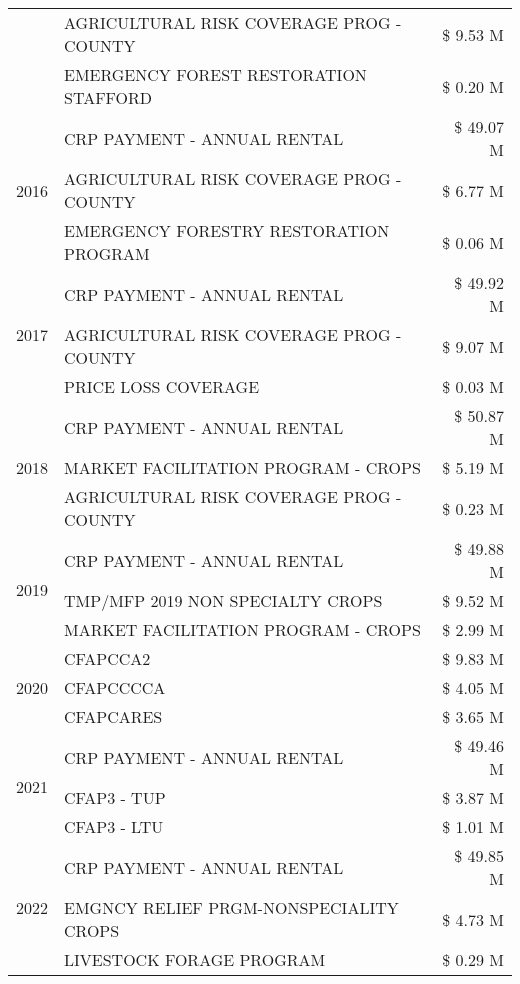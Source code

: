 \begin{tabular}{llr}
 & AGRICULTURAL RISK COVERAGE PROG - COUNTY & \$ 9.53 M \\
 & EMERGENCY FOREST RESTORATION STAFFORD & \$ 0.20 M \\
\cline{1-3}
\multirow[t]{3}{*}{2016} & CRP PAYMENT - ANNUAL RENTAL & \$ 49.07 M \\
 & AGRICULTURAL RISK COVERAGE PROG - COUNTY & \$ 6.77 M \\
 & EMERGENCY FORESTRY RESTORATION PROGRAM & \$ 0.06 M \\
\cline{1-3}
\multirow[t]{3}{*}{2017} & CRP PAYMENT - ANNUAL RENTAL & \$ 49.92 M \\
 & AGRICULTURAL RISK COVERAGE PROG - COUNTY & \$ 9.07 M \\
 & PRICE LOSS COVERAGE & \$ 0.03 M \\
\cline{1-3}
\multirow[t]{3}{*}{2018} & CRP PAYMENT - ANNUAL RENTAL & \$ 50.87 M \\
 & MARKET FACILITATION PROGRAM - CROPS & \$ 5.19 M \\
 & AGRICULTURAL RISK COVERAGE PROG - COUNTY & \$ 0.23 M \\
\cline{1-3}
\multirow[t]{3}{*}{2019} & CRP PAYMENT - ANNUAL RENTAL & \$ 49.88 M \\
 & TMP/MFP 2019 NON SPECIALTY CROPS & \$ 9.52 M \\
 & MARKET FACILITATION PROGRAM - CROPS & \$ 2.99 M \\
\cline{1-3}
\multirow[t]{3}{*}{2020} & CFAPCCA2 & \$ 9.83 M \\
 & CFAPCCCCA & \$ 4.05 M \\
 & CFAPCARES & \$ 3.65 M \\
\cline{1-3}
\multirow[t]{3}{*}{2021} & CRP PAYMENT - ANNUAL RENTAL & \$ 49.46 M \\
 & CFAP3 - TUP & \$ 3.87 M \\
 & CFAP3 - LTU & \$ 1.01 M \\
\cline{1-3}
\multirow[t]{3}{*}{2022} & CRP PAYMENT - ANNUAL RENTAL & \$ 49.85 M \\
 & EMGNCY RELIEF PRGM-NONSPECIALITY CROPS & \$ 4.73 M \\
 & LIVESTOCK FORAGE PROGRAM & \$ 0.29 M \\
\cline{1-3}
\bottomrule
\end{tabular}
